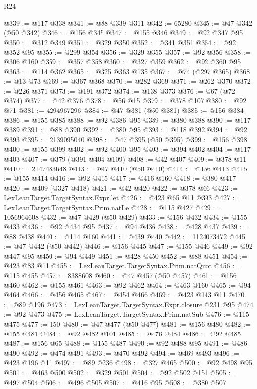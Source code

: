 \begin{lexlean}{R24}
\begin{coremodule}
@339 := @117 @338
@341 := @88 @339 @311
@342 := 65280
@345 := @47 @342 (@50 @342)
@346 := @156 @345
@347 := @155 @346
@349 := @92 @347 @95
@350 := @312 @349
@351 := @329 @350
@352 := @341 @351
@354 := @92 @352 @95
@355 := @299 @354
@356 := @329 @355
@357 := @92 @356
@358 := @306 @160
@359 := @357 @358
@360 := @327 @359
@362 := @92 @360 @95
@363 := @114 @362
@365 := @325 @363 @135
@367 := @74 (@297 @365)
@368 := @13 @73
@369 := @367 @368
@370 := @282 @369
@371 := @262 @370
@372 := @226 @371
@373 := @191 @372
@374 := @138 @373
@376 := @67 (@72 @374)
@377 := @42 @376
@378 := @56 @15
@379 := @378 @107
@380 := @92 @71
@381 := 4294967296
@384 := @47 @381 (@50 @381)
@385 := @156 @384
@386 := @155 @385
@388 := @92 @386 @95
@389 := @380 @388
@390 := @117 @389
@391 := @88 @390
@392 := @380 @95
@393 := @118 @392
@394 := @92 @393
@395 := 2139095040
@398 := @47 @395 (@50 @395)
@399 := @156 @398
@400 := @155 @399
@402 := @92 @400 @95
@403 := @394 @402
@404 := @117 @403
@407 := @379 (@391 @404 @109)
@408 := @42 @407
@409 := @378 @11
@410 := 2147483648
@413 := @47 @410 (@50 @410)
@414 := @156 @413
@415 := @155 @414
@416 := @92 @415
@417 := @416 @160
@418 := @380 @417
@420 := @409 (@327 @418)
@421 := @42 @420
@422 := @378 @66
@423 := LexLeanTarget.TargetSyntax.Expr.let
@426 := @423 @65 @11 @393
@427 := LexLeanTarget.TargetSyntax.Prim.natLe
@428 := @115 @427
@429 := 1056964608
@432 := @47 @429 (@50 @429)
@433 := @156 @432
@434 := @155 @433
@436 := @92 @434 @95
@437 := @94 @436
@438 := @428 @437
@439 := @88 @438
@440 := @114 @160
@441 := @439 @440
@442 := 1124073472
@445 := @47 @442 (@50 @442)
@446 := @156 @445
@447 := @155 @446
@449 := @92 @447 @95
@450 := @94 @449
@451 := @428 @450
@452 := @88 @451
@454 := @423 @83 @11
@455 := LexLeanTarget.TargetSyntax.Prim.natQuot
@456 := @115 @455
@457 := 8388608
@460 := @47 @457 (@50 @457)
@461 := @156 @460
@462 := @155 @461
@463 := @92 @462
@464 := @463 @160
@465 := @94 @464
@466 := @456 @465
@467 := @454 @466
@469 := @423 @143 @11
@470 := @89 @196
@473 := LexLeanTarget.TargetSyntax.Expr.closure @231 @95
@474 := @92 @473
@475 := LexLeanTarget.TargetSyntax.Prim.natSub
@476 := @115 @475
@477 := 150
@480 := @47 @477 (@50 @477)
@481 := @156 @480
@482 := @155 @481
@484 := @92 @482 @101
@485 := @476 @484
@486 := @92 @485
@487 := @156 @65
@488 := @155 @487
@490 := @92 @488 @95
@491 := @486 @490
@492 := @474 @491
@493 := @470 @492
@494 := @469 @493
@496 := @423 @196 @11
@497 := @89 @236
@498 := @327 @465
@500 := @92 @498 @95
@501 := @463 @500
@502 := @329 @501
@504 := @92 @502 @151
@505 := @497 @504
@506 := @496 @505
@507 := @416 @95
@508 := @380 @507

\end{coremodule}
\end{lexlean}
